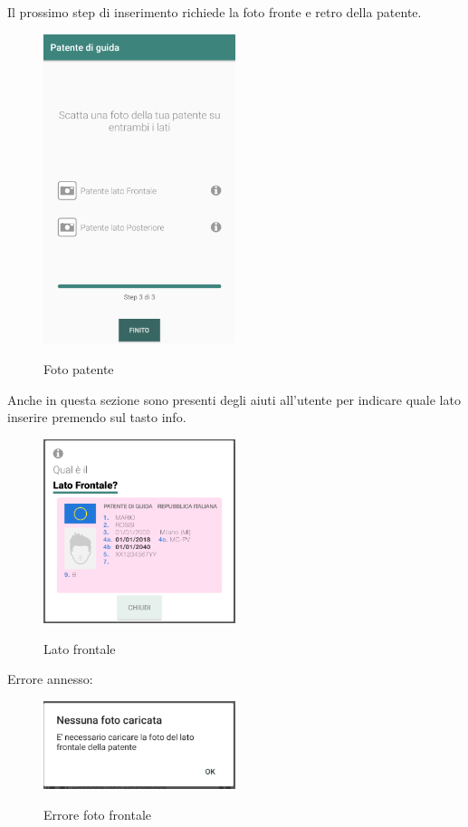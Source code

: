 \begin{itemize}
Il prossimo step di inserimento richiede la foto fronte e retro della patente.
\begin{figure}[H]
	\centering
	\includegraphics[width=0.5\textwidth]{res/images/patente3.png}\\
	\caption{Foto patente}
	\label{patente7}
\end{figure}
\pagebreak

Anche in questa sezione sono presenti degli aiuti all'utente per indicare quale lato inserire premendo sul tasto info.
\begin{figure}[H] 
	\centering 
	\includegraphics[width=0.5\textwidth]{res/images/patente3_1.png}\\
	\caption{Lato frontale}
	\label{patente8}
\end{figure}
Errore annesso:
\begin{figure}[H] 
	\centering 
	\includegraphics[width=0.5\textwidth]{res/images/patente3errore_front.png}\\
	\caption{Errore foto frontale}
	\label{patenteerror3}
\end{figure}
\pagebreak


\end{itemize}

